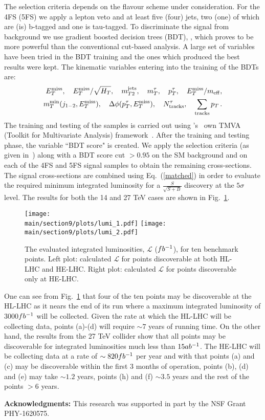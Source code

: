 The selection criteria depends on the flavour scheme under consideration. For the 4FS (5FS) we apply a lepton veto and at least five (four) jets, two (one) of which are (is) b-tagged and one is tau-tagged. To discriminate the signal from background we use gradient boosted decision trees (BDT), , which proves to be more powerful than the conventional cut-based analysis. A large set of variables have been tried in the BDT training and the ones which produced the best results were kept. The kinematic variables entering into the training of the BDTs are: 
\begin{align}
E^{\rm miss}_T, ~~~ E^{\rm miss}_T/\sqrt{H_T}, ~~~m_{T2}^{\rm jets}, ~~~m_T^{\tau}, ~~~p_T^{\tau}, ~~~E^{\rm miss}_T/m_{\rm eff},  \nonumber \\
m_T^{\rm min}(j_{1-2},E^{\rm miss}_T), ~~~\Delta\phi(p^{\tau}_T,E^{\rm miss}_T), ~~~N_{\rm tracks}^{\tau}, ~~~\sum_{\rm tracks} p_T \, .
\end{align}
The training and testing of the samples is carried out using 's~\cite{Antcheva:2011zz} own TMVA (Toolkit for Multivariate Analysis) framework~\cite{Speckmayer:2010zz}. After the training and testing phase, the variable ``BDT score" is created. We apply the selection criteria (as given in~\cite{Aboubrahim:2018tpf}) along with a BDT score cut $>0.95$ on the SM background and on each of the 4FS and 5FS signal samples to obtain the remaining cross-sections. The signal cross-sections are combined using Eq.~(\ref{matched}) in order to evaluate the required minimum integrated luminosity for a $\frac{S}{\sqrt{S+B}}$ discovery at the $5\sigma$ level. The results for both the 14 and 27 TeV cases are shown in Fig.~\ref{fig1}. 

\begin{figure}[H]
 \centering
   \texttt{[image: \\main/section9/plots/lumi\_1.pdf]} 
      \texttt{[image: \\main/section9/plots/lumi\_2.pdf]}
   \caption{The evaluated integrated luminosities, $\mathcal{L}$ ($fb^{-1}$), for ten benchmark points. Left plot: calculated $\mathcal{L}$ for points discoverable at both HL-LHC and HE-LHC. Right plot: calculated $\mathcal{L}$ for points discoverable only at HE-LHC.}
	\label{fig1}
\end{figure}

One can see from Fig.~\ref{fig1} that four of the ten points may be discoverable at the HL-LHC as it nears the end of its run where a maximum integrated luminosity of 3000$fb^{-1}$ will be collected. Given the rate at which the HL-LHC will be collecting data, points (a)-(d) will require $\sim 7$ years of running time. On the other hand, the results from the 27 TeV collider show that all points may be discoverable for integrated luminosities much less than $15ab^{-1}$. The HE-LHC will be collecting data at a rate of $\sim 820fb^{-1}$ per year and with that points (a) and (c) may be discoverable within the first 3 months of operation, points (b), (d) and (e) may take $\sim 1.2$ years, points (h) and (f) $\sim 3.5$ years and the rest of the points $>6$ years.  


\textbf{Acknowledgments:}
This research was supported in part by the NSF Grant PHY-1620575.
